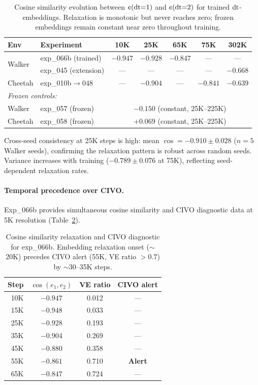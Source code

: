 \begin{table}[h]
\centering
\caption{Cosine similarity evolution between $e(\mathrm{dt}{=}1)$ and $e(\mathrm{dt}{=}2)$ for trained $\mathrm{dt}$-embeddings. Relaxation is monotonic but never reaches zero; frozen embeddings remain constant near zero throughout training.}
\label{tab:cosine_evolution_ext}
\footnotesize
\setlength{\tabcolsep}{4pt}
\begin{tabular}{llccccc}
\toprule
\textbf{Env} & \textbf{Experiment} & \textbf{10K} & \textbf{25K} & \textbf{65K} & \textbf{75K} & \textbf{302K} \\
\midrule
\multirow{2}{*}{Walker} & exp\_066b (trained) & $-0.947$ & $-0.928$ & $-0.847$ & --- & --- \\
 & exp\_045 (extension) & --- & --- & --- & --- & $-0.668$ \\
\midrule
Cheetah & exp\_010b$\to$048 & --- & $-0.904$ & --- & $-0.841$ & $-0.639$ \\
\midrule
\multicolumn{2}{l}{\textit{Frozen controls:}} \\
Walker & exp\_057 (frozen) & \multicolumn{5}{c}{$-0.150$ (constant, 25K--225K)} \\
Cheetah & exp\_058 (frozen) & \multicolumn{5}{c}{$+0.069$ (constant, 25K--225K)} \\
\bottomrule
\end{tabular}
\end{table}

Cross-seed consistency at 25K steps is high: mean $\cos = -0.910 \pm 0.028$ ($n{=}5$ Walker seeds), confirming the relaxation pattern is robust across random seeds. Variance increases with training ($-0.789 \pm 0.076$ at 75K), reflecting seed-dependent relaxation rates.

\paragraph{Temporal precedence over CIVO.}
Exp\_066b provides simultaneous cosine similarity and CIVO diagnostic data at 5K resolution (Table~\ref{tab:cosine_vs_civo}).

\begin{table}[h]
\centering
\caption{Cosine similarity relaxation and CIVO diagnostic for exp\_066b. Embedding relaxation onset (${\sim}$20K) precedes CIVO alert (55K, VE ratio $> 0.7$) by ${\sim}$30--35K steps.}
\label{tab:cosine_vs_civo}
\footnotesize
\setlength{\tabcolsep}{5pt}
\begin{tabular}{rccc}
\toprule
\textbf{Step} & $\cos(e_1, e_2)$ & \textbf{VE ratio} & \textbf{CIVO alert} \\
\midrule
10K & $-0.947$ & 0.012 & --- \\
15K & $-0.948$ & 0.033 & --- \\
25K & $-0.928$ & 0.193 & --- \\
35K & $-0.904$ & 0.269 & --- \\
45K & $-0.880$ & 0.358 & --- \\
55K & $-0.861$ & 0.710 & \textbf{Alert} \\
65K & $-0.847$ & 0.724 & --- \\
\bottomrule
\end{tabular}
\end{table}

